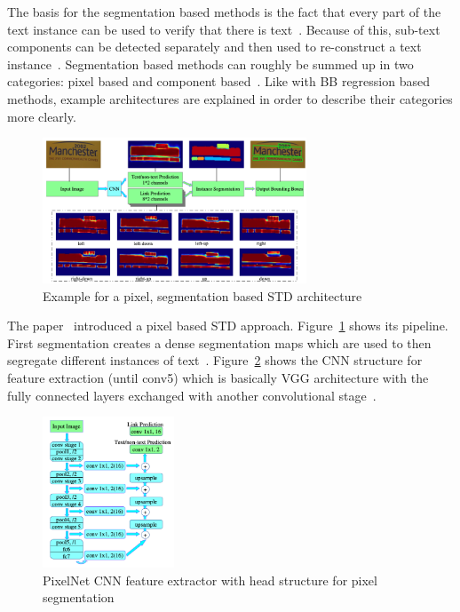 The basis for the segmentation based methods is the fact that every part of the text instance can
be used to verify that there is text~\citep{long_scene_2021}.
Because of this, sub-text components can be detected separately and then used to re-construct a text
instance~\citep{long_scene_2021}.
Segmentation based methods can roughly be summed up in two categories: pixel based and component
based~\citep{long_scene_2021}.
Like with \ac{BB} regression based methods, example architectures are explained in order to
describe their categories more clearly.
\begin{figure}[ht]
    \centering
    \includegraphics[width=0.7\textwidth]{img/STD-seg-based-architecture-Deng-PixelLink-2018.png}
    \caption[Pixel, segmentation based STD architecture]{%
        Example for a pixel, segmentation based STD
        architecture~\citep{deng_pixellink_2018}\label{fig:STD-segbased-pixel-architecture}
    }
\end{figure}
The paper~\cite{deng_pixellink_2018} introduced a pixel based \ac{STD} approach.
Figure~\ref{fig:STD-segbased-pixel-architecture} shows its pipeline.
First segmentation creates a dense segmentation maps which are used to then segregate different
instances of text~\citep{deng_pixellink_2018}.
Figure~\ref{fig:STD-segbased-pixel-CNN} shows the \ac{CNN} structure for feature extraction
(until conv5) which is basically VGG architecture with the fully connected layers exchanged with
another convolutional stage~\citep{deng_pixellink_2018}.
\begin{figure}[ht]
    \centering
    \includegraphics[width=0.35\textwidth]{img/STD-seg-based-CNN-Deng-PixelLink-2018.png}
    \caption[Feature extractor and prediction head for pixel segmentation]{%
        PixelNet CNN feature extractor with head structure for pixel
        segmentation\label{fig:STD-segbased-pixel-CNN}
    }
\end{figure}
